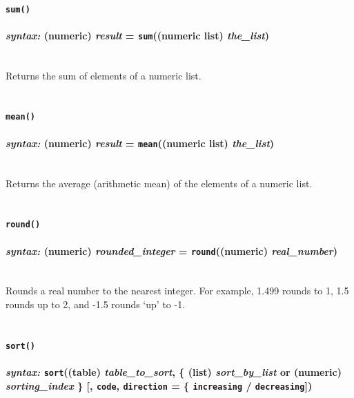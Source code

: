 \documentclass{article}
\begin{document}
\paragraph{\texttt{sum()}\\\\
\normalfont \emph{syntax: } (numeric) \emph{result} = \texttt{sum}((numeric list) \emph{the\_list})\\\\}

Returns the sum of elements of a numeric list.\\\\



\paragraph{\texttt{mean()}\\\\
\normalfont \emph{syntax: } (numeric) \emph{result} = \texttt{mean}((numeric list) \emph{the\_list})\\\\}

Returns the average (arithmetic mean) of the elements of a numeric list.\\\\



\paragraph{\texttt{round()}\\\\
\normalfont \emph{syntax: } (numeric) \emph{rounded\_integer} = \texttt{round}((numeric) \emph{real\_number})\\\\}

Rounds a real number to the nearest integer.  For example, 1.499 rounds to 1, 1.5 rounds up to 2, and -1.5 rounds `up' to -1.\\\\



\paragraph{\texttt{sort()}\\\\
\normalfont \emph{syntax: } \texttt{sort}((table) \emph{table\_to\_sort}, \{ (list) \emph{sort\_by\_list} or (numeric) \emph{sorting\_index} \} [, \texttt{code}, \texttt{direction} = \{ \texttt{increasing} / \texttt{decreasing}])\\\\}
\end{document}
